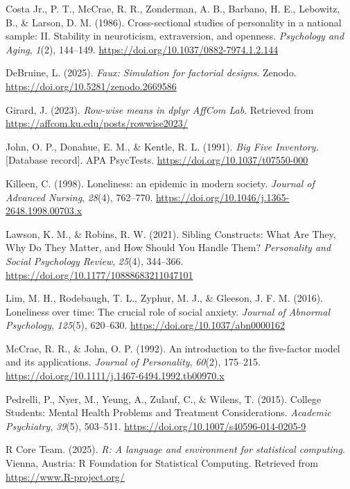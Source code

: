 \documentclass[
  english,
  man]{apa6}
\newlength{\cslhangindent}
\newenvironment{CSLReferences}[2] %
 {\begin{list}{}{%
  \setlength{\itemindent}{0pt}
  \setlength{\leftmargin}{0pt}
  \setlength{\parsep}{0pt}
  \ifodd #1
   \setlength{\leftmargin}{\cslhangindent}
   \setlength{\itemindent}{-1\cslhangindent}
  \fi
  \setlength{\itemsep}{#2\baselineskip}}}
 {\end{list}}
\begin{document}
\begin{CSLReferences}{1}{0}
Costa Jr., P. T., McCrae, R. R., Zonderman, A. B., Barbano, H. E., Lebowitz, B., \& Larson, D. M. (1986). Cross-sectional studies of personality in a national sample: II. Stability in neuroticism, extraversion, and openness. \emph{Psychology and Aging}, \emph{1}(2), 144--149. \url{https://doi.org/10.1037/0882-7974.1.2.144}

DeBruine, L. (2025). \emph{Faux: Simulation for factorial designs}. Zenodo. \url{https://doi.org/10.5281/zenodo.2669586}

Girard, J. (2023). \emph{Row-wise means in dplyr {\textendash} AffCom Lab}. Retrieved from \url{https://affcom.ku.edu/posts/rowwise2023/}

John, O. P., Donahue, E. M., \& Kentle, R. L. (1991). \emph{Big Five Inventory}. {[}Database record{]}. APA PsycTests. \url{https://doi.org/10.1037/t07550-000}

Killeen, C. (1998). Loneliness: an epidemic in modern society. \emph{Journal of Advanced Nursing}, \emph{28}(4), 762--770. \url{https://doi.org/10.1046/j.1365-2648.1998.00703.x}

Lawson, K. M., \& Robins, R. W. (2021). Sibling Constructs: What Are They, Why Do They Matter, and How Should You Handle Them? \emph{Personality and Social Psychology Review}, \emph{25}(4), 344--366. \url{https://doi.org/10.1177/10888683211047101}

Lim, M. H., Rodebaugh, T. L., Zyphur, M. J., \& Gleeson, J. F. M. (2016). Loneliness over time: The crucial role of social anxiety. \emph{Journal of Abnormal Psychology}, \emph{125}(5), 620--630. \url{https://doi.org/10.1037/abn0000162}

McCrae, R. R., \& John, O. P. (1992). An introduction to the five-factor model and its applications. \emph{Journal of Personality}, \emph{60}(2), 175--215. \url{https://doi.org/10.1111/j.1467-6494.1992.tb00970.x}

Pedrelli, P., Nyer, M., Yeung, A., Zulauf, C., \& Wilens, T. (2015). College Students: Mental Health Problems and Treatment Considerations. \emph{Academic Psychiatry}, \emph{39}(5), 503--511. \url{https://doi.org/10.1007/s40596-014-0205-9}

R Core Team. (2025). \emph{R: A language and environment for statistical computing}. Vienna, Austria: R Foundation for Statistical Computing. Retrieved from \url{https://www.R-project.org/}


\end{CSLReferences}
\end{document}
